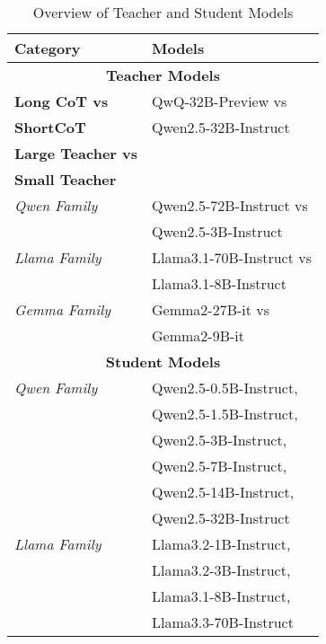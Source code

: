
\begin{table}[h]
    \centering
    \small
    \begin{tabular}{ll}
        \toprule
        \textbf{Category} & \textbf{Models} \\
        \midrule
        \multicolumn{2}{c}{\textbf{Teacher Models}} \\
        \midrule
        \textbf{Long CoT vs} & QwQ-32B-Preview vs\\\textbf{ShortCoT}& Qwen2.5-32B-Instruct \\
        \midrule
        \textbf{Large Teacher vs}  & \\
        \textbf{Small Teacher}& \\
        \textit{Qwen Family} & Qwen2.5-72B-Instruct vs\\& Qwen2.5-3B-Instruct \\
        \textit{Llama Family} & Llama3.1-70B-Instruct vs\\& Llama3.1-8B-Instruct \\
        \textit{Gemma Family} & Gemma2-27B-it vs\\& Gemma2-9B-it \\
        \midrule
        \multicolumn{2}{c}{\textbf{Student Models}} \\
        \midrule
        \textit{Qwen Family} & Qwen2.5-0.5B-Instruct,\\& Qwen2.5-1.5B-Instruct, \\
        & Qwen2.5-3B-Instruct, \\&Qwen2.5-7B-Instruct, \\
        & Qwen2.5-14B-Instruct,\\& Qwen2.5-32B-Instruct \\
        \textit{Llama Family} & Llama3.2-1B-Instruct,\\& Llama3.2-3B-Instruct, \\
        & Llama3.1-8B-Instruct,\\& Llama3.3-70B-Instruct \\
        \bottomrule
    \end{tabular}
    \caption{Overview of Teacher and Student Models}
    \label{tab:models_overview}
\end{table}